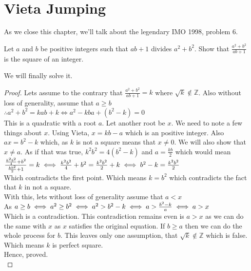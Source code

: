 \section{Vieta Jumping}
As we close this chapter, we'll talk about the legendary IMO 1998, problem 6.\\
\begin{example}
    Let $a$ and $b$ be positive integers such that $ab + 1$ divides $a^{2} + b^{2}$. Show that $\frac {a^{2} + b^{2}}{ab + 1}$ is the square of an integer.
\end{example}
We will finally solve it.\\
\begin{proof}
    Lets assume to the contrary that $\frac{a^2+b^2}{ab+1}=k$ where $\sqrt{k} \notin \mathbb{Z}$. Also without loss of generality, assume that $a\geq b$ \\
    $\therefore a^2+b^2=kab+k \iff a^2-kba+(b^2-k)=0$\\
    This is a quadratic with a root $a$. Let another root be $x$. We need to note a few things about $x$. Using Vieta, $x=kb-a$ which is an positive integer. Also $ax=b^2-k$ which, as $k$ is not a square means that $x\neq0$. We will also show that $x \neq a$. As if that was true, $k^2b^2=4(b^2-k)$ and $a=\frac{kb}{2}$ which would mean\\
    $\frac{\frac{k^2b^2}{4}+b^2}{\frac{kb^2}{2}+1}=k \\
    \iff \frac{k^2b^2}{4}+b^2=\frac{k^2b^2}{2}+k \\
    \iff b^2-k=\frac{k^2b^2}{2}$\\
    Which contradicts the first point. Which means $k=b^2$ which contradicts the fact that $k$ in not a square.\\
    With this, lets without loss of generality assume that $a<x$\\
    As $a \geq b\\
    \iff a^2 \geq b^2\\
    \iff a^2 > b^2-k\\
    \iff a > \frac{b^2-k}{a}\\
    \iff a > x$\\
    Which is a contradiction. This contradiction remains even is $a>x$ as we can do the same with $x$ as $x$ satisfies the original equation. If $b\geq a$ then we can do the whole process for $b$. This leaves only one assumption, that $\sqrt{k} \notin \mathbb{Z}$ which is false. Which means $k$ is perfect square.\\
    Hence, proved.\\
\end{proof}
